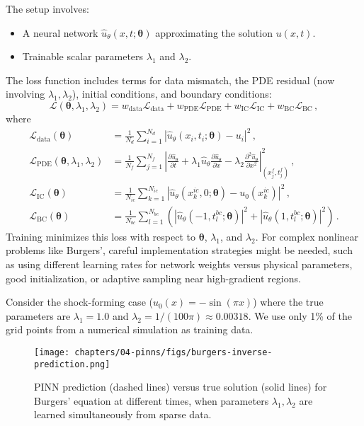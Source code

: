 The setup involves:
\begin{itemize}
    \item A neural network $\hat{u}_\theta(x, t; \boldsymbol{\theta})$ approximating the solution $u(x, t)$.
    \item Trainable scalar parameters $\lambda_1$ and $\lambda_2$.
\end{itemize}
The loss function includes terms for data mismatch, the PDE residual (now involving $\lambda_1, \lambda_2$), initial conditions, and boundary conditions:
%
\begin{equation*}
\mathcal{L}(\boldsymbol{\theta}, \lambda_1, \lambda_2) = w_{\text{data}}\mathcal{L}_{\text{data}} + w_{\text{PDE}}\mathcal{L}_{\text{PDE}} + w_{\text{IC}}\mathcal{L}_{\text{IC}} + w_{\text{BC}}\mathcal{L}_{\text{BC}}\,,
\end{equation*}
%
where
%
\begin{align*}
\mathcal{L}_\text{data}(\boldsymbol{\theta}) &= \frac{1}{N_d}\sum_{i=1}^{N_d}|\hat{u}_\theta(x_i, t_i; \boldsymbol{\theta}) - u_i|^2\,, \\
\mathcal{L}_\text{PDE}(\boldsymbol{\theta}, \lambda_1, \lambda_2) &= \frac{1}{N_f}\sum_{j=1}^{N_f}|\frac{\partial \hat{u}_\theta}{\partial t} + \lambda_1 \hat{u}_\theta\frac{\partial \hat{u}_\theta}{\partial x} - \lambda_2 \frac{\partial^2 \hat{u}_\theta}{\partial x^2}|^2_{(x_j^f, t_j^f)}\,, \\
\mathcal{L}_\text{IC}(\boldsymbol{\theta}) &= \frac{1}{N_{ic}}\sum_{k=1}^{N_{ic}}|\hat{u}_\theta(x_k^{ic}, 0; \boldsymbol{\theta}) - u_0(x_k^{ic})|^2\,, \\
\mathcal{L}_\text{BC}(\boldsymbol{\theta}) &= \frac{1}{N_{bc}}\sum_{l=1}^{N_{bc}}(|\hat{u}_\theta(-1, t_l^{bc}; \boldsymbol{\theta})|^2 + |\hat{u}_\theta(1, t_l^{bc}; \boldsymbol{\theta})|^2)\,. %
\end{align*}
%
Training minimizes this loss with respect to $\boldsymbol{\theta}$, $\lambda_1$, and $\lambda_2$. For complex nonlinear problems like Burgers', careful implementation strategies might be needed, such as using different learning rates for network weights versus physical parameters, good initialization, or adaptive sampling near high-gradient regions.

Consider the shock-forming case ($u_0(x) = -\sin(\pi x)$) where the true parameters are $\lambda_1 = 1.0$ and $\lambda_2 = 1/(100\pi) \approx 0.00318$. We use only 1\% of the grid points from a numerical simulation as training data.

\begin{figure}[htbp]
\centering
\texttt{[image: chapters/04-pinns/figs/burgers-inverse-prediction.png]}
\caption{PINN prediction (dashed lines) versus true solution (solid lines) for Burgers' equation at different times, when parameters $\lambda_1, \lambda_2$ are learned simultaneously from sparse data.}
\label{fig:burgers_inverse}
\end{figure}

